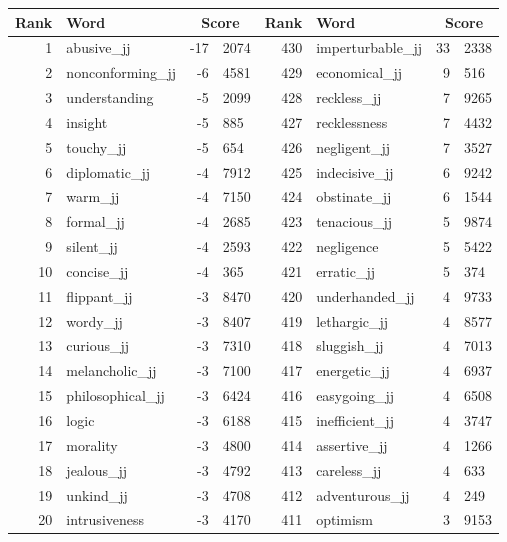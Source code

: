 \begin{table}[tbp]
    \begin{tabular}{| rlr@{.}l | rlr@{.}l |}
    \hline
    \textbf{Rank} & \textbf{Word} & \multicolumn{2}{c|}{\textbf{Score}} & \textbf{Rank} & \textbf{Word} & \multicolumn{2}{c|}{\textbf{Score}} \\
    \hline
    1 & abusive\_jj & -17 & 2074    &    430 & imperturbable\_jj & 33 & 2338 \\
    2 & nonconforming\_jj & -6 & 4581    &    429 & economical\_jj & 9 & 516 \\
    3 & understanding & -5 & 2099    &    428 & reckless\_jj & 7 & 9265 \\
    4 & insight & -5 & 885    &    427 & recklessness & 7 & 4432 \\
    5 & touchy\_jj & -5 & 654    &    426 & negligent\_jj & 7 & 3527 \\
    6 & diplomatic\_jj & -4 & 7912    &    425 & indecisive\_jj & 6 & 9242 \\
    7 & warm\_jj & -4 & 7150    &    424 & obstinate\_jj & 6 & 1544 \\
    8 & formal\_jj & -4 & 2685    &    423 & tenacious\_jj & 5 & 9874 \\
    9 & silent\_jj & -4 & 2593    &    422 & negligence & 5 & 5422 \\
    10 & concise\_jj & -4 & 365    &    421 & erratic\_jj & 5 & 374 \\
    11 & flippant\_jj & -3 & 8470    &    420 & underhanded\_jj & 4 & 9733 \\
    12 & wordy\_jj & -3 & 8407    &    419 & lethargic\_jj & 4 & 8577 \\
    13 & curious\_jj & -3 & 7310    &    418 & sluggish\_jj & 4 & 7013 \\
    14 & melancholic\_jj & -3 & 7100    &    417 & energetic\_jj & 4 & 6937 \\
    15 & philosophical\_jj & -3 & 6424    &    416 & easygoing\_jj & 4 & 6508 \\
    16 & logic & -3 & 6188    &    415 & inefficient\_jj & 4 & 3747 \\
    17 & morality & -3 & 4800    &    414 & assertive\_jj & 4 & 1266 \\
    18 & jealous\_jj & -3 & 4792    &    413 & careless\_jj & 4 & 633 \\
    19 & unkind\_jj & -3 & 4708    &    412 & adventurous\_jj & 4 & 249 \\
    20 & intrusiveness & -3 & 4170    &    411 & optimism & 3 & 9153 \\

\end{tabular}
\end{table}

